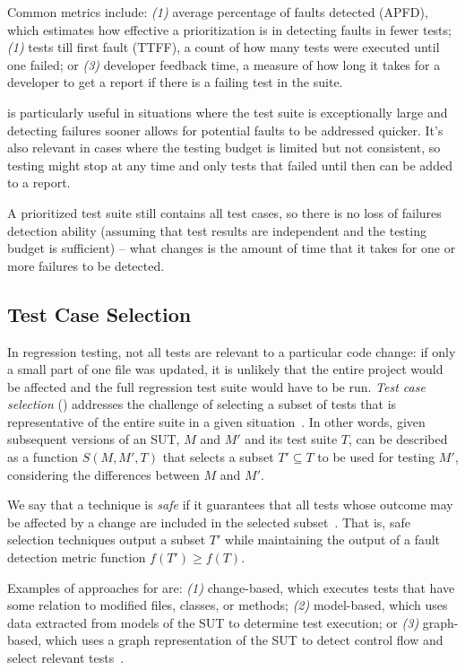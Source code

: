 Common metrics include: \textit{(1)} average percentage of faults detected (APFD), which estimates how effective a prioritization is in detecting faults in fewer tests; \textit{(1)} tests till first fault (TTFF), a count of how many tests were executed until one failed; or \textit{(3)} developer feedback time, a measure of how long it takes for a developer to get a report if there is a failing test in the suite.

\tcp is particularly useful in situations where the test suite is exceptionally large and detecting failures sooner allows for potential faults to be addressed quicker.
It's also relevant in cases where the testing budget is limited but not consistent, so testing might stop at any time and only tests that failed until then can be added to a report.

A prioritized test suite still contains all test cases, 
so there is no loss of failures detection ability (assuming that test results are independent and the testing budget is sufficient) -- what changes is the amount of time that it takes for one or more failures to be detected.


\subsection{Test Case Selection}
\label{sec:tcs}

In regression testing, not all tests are relevant to a particular code change:
if only a small part of one file was updated, it is unlikely that the entire project would be affected and the full regression test suite would have to be run.
\textit{Test case selection} (\tcs) addresses the challenge of selecting a subset of tests that is representative of the entire suite in a given situation~\cite{YooHarman10RegressionTestingSurvey, RothermelHarrold94FrameworkForEvaluationRTS}.
In other words, given subsequent versions of an SUT, $M$ and $M'$ and its test suite $T$, 
\tcs can be described as a function $S(M, M', T)$ that selects a subset $T' \subseteq T$ to be used for testing $M'$, considering the differences between $M$ and $M'$.

We say that a \tcs technique is \emph{safe} if it guarantees that all tests whose outcome may be affected by a change are included in the selected subset~\cite{RothermelHarrold94FrameworkForEvaluationRTS}.
That is, safe selection techniques output a subset $T'$ while maintaining the output of a fault detection metric function $f(T') \geq f(T)$.

Examples of approaches for \tcs are: \textit{(1)} change-based, which executes tests that have some relation to modified files, classes, or methods; \textit{(2)} model-based, which uses data extracted from models of the SUT to determine test execution; or \textit{(3)} graph-based, which uses a graph representation of the SUT to detect control flow and select relevant tests~\cite{kazmi_effective_2017}.

